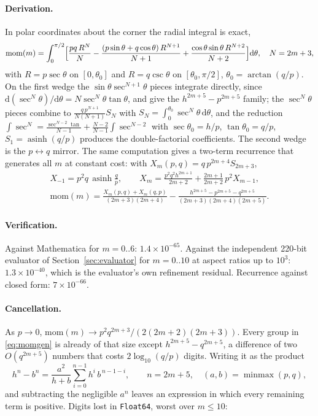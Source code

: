 \documentclass[11pt]{article}
\theoremstyle{remark}
\newcommand{\dd}{\mathrm{d}}
\newcommand{\asinh}{\operatorname{asinh}}
\newcommand{\code}[1]{\texttt{#1}}
\begin{document}
\paragraph{Derivation.} In polar coordinates about the corner the radial integral is
exact,
\begin{equation}
\mathrm{mom}(m) = \int_0^{\pi/2}\Bigl[\frac{pq\,R^N}{N} - \frac{(p\sin\theta + q\cos\theta)\,R^{N+1}}{N+1} + \frac{\cos\theta\sin\theta\,R^{N+2}}{N+2}\Bigr]\dd\theta,
\quad N = 2m+3,
\end{equation}
with $R = p\sec\theta$ on $[0, \theta_0]$ and $R = q\csc\theta$ on $[\theta_0,\pi/2]$,
$\theta_0 = \arctan(q/p)$. On the first wedge the $\sin\theta\sec^{N+1}\theta$
pieces integrate directly, since $\dd(\sec^N\theta)/\dd\theta = N\sec^N\theta\tan\theta$,
and give the $h^{2m+5} - p^{2m+5}$ family; the $\sec^N\theta$ pieces combine to
$\frac{q\,p^{N+1}}{N(N+1)} S_N$ with $S_N = \int_0^{\theta_0}\sec^N\theta\,\dd\theta$,
and the reduction $\int\sec^N = \frac{\sec^{N-2}\tan}{N-1} + \frac{N-2}{N-1}\int\sec^{N-2}$
with $\sec\theta_0 = h/p$, $\tan\theta_0 = q/p$, $S_1 = \asinh(q/p)$ produces the
double-factorial coefficients. The second wedge is the $p\leftrightarrow q$ mirror. The
same computation gives a two-term recurrence that generates all $m$ at constant cost:
with $X_m(p,q) = q\,p^{2m+4} S_{2m+3}$,
\begin{gather}
X_{-1} = p^2 q\,\asinh\frac{q}{p},\qquad
X_m = \frac{p^2 q^2 h^{2m+1}}{2m+2} + \frac{2m+1}{2m+2}\,p^2 X_{m-1},\\
\mathrm{mom}(m) = \frac{X_m(p,q) + X_m(q,p)}{(2m+3)(2m+4)} - \frac{h^{2m+5} - p^{2m+5} - q^{2m+5}}{(2m+3)(2m+4)(2m+5)} .
\end{gather}

\paragraph{Verification.} Against Mathematica for $m = 0..6$: $1.4\times10^{-65}$.
Against the independent 220-bit evaluator of Section~\ref{sec:evaluator} for
$m = 0..10$ at aspect ratios up to $10^3$: $1.3\times10^{-40}$, which is the
evaluator's own refinement residual. Recurrence against closed form: $7\times10^{-66}$.

\paragraph{Cancellation.} As $p\to 0$, $\mathrm{mom}(m)\to p^2 q^{2m+3}/(2(2m+2)(2m+3))$.
Every group in \eqref{eq:momgen} is already of that size except
$h^{2m+5} - q^{2m+5}$, a difference of two $O(q^{2m+5})$ numbers that costs
$2\log_{10}(q/p)$ digits. Writing it as the product
\begin{equation}
h^n - b^n = \frac{a^2}{h + b}\sum_{i=0}^{n-1} h^i\, b^{\,n-1-i},\qquad n = 2m+5,\quad (a,b) = \operatorname{minmax}(p,q),
\end{equation}
and subtracting the negligible $a^n$ leaves an expression in which every remaining
term is positive. Digits lost in \code{Float64}, worst over $m\le 10$:
\end{document}
